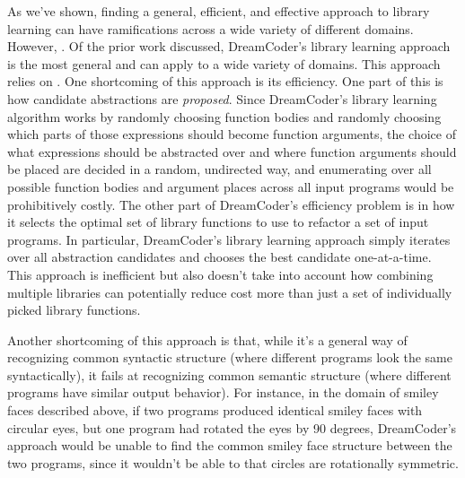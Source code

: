 As we've shown, finding a general, efficient, and effective approach to
library learning can have ramifications across a wide variety of different
domains.
%
However, .
%
Of the prior work discussed, DreamCoder's library learning approach is the
most general and can apply to a wide variety of domains.
%
This approach relies on .
%
%
One shortcoming of this approach is its efficiency. One part of this is how
candidate abstractions are \emph{proposed}. Since DreamCoder's library learning
algorithm works by randomly choosing function bodies and randomly choosing
which parts of those expressions should become function arguments, the choice
of what expressions should be abstracted over and where function arguments
should be placed are decided in a random, undirected way, and enumerating over
all possible function bodies and argument places across all input programs would
be prohibitively costly.
%
The other part of DreamCoder's efficiency problem is in how it selects the
optimal set of library functions to use to refactor a set of input programs.
In particular, DreamCoder's library learning approach simply iterates over
all abstraction candidates and chooses the best candidate one-at-a-time.
%
This approach is inefficient but also doesn't take into account how
combining multiple libraries can potentially reduce cost more than
just a set of individually picked library functions.

Another shortcoming of this approach is that, while it's a general way of
recognizing common syntactic structure (where different programs look the same
syntactically), it fails at recognizing common semantic structure (where
different programs have similar output behavior).
%
For instance, in the domain of smiley faces described above, if two programs
produced identical smiley faces with circular eyes, but one program had rotated
the eyes by 90 degrees, DreamCoder's approach would be unable to find the common
smiley face structure between the two programs, since it wouldn't be able to
 that circles are rotationally symmetric.

